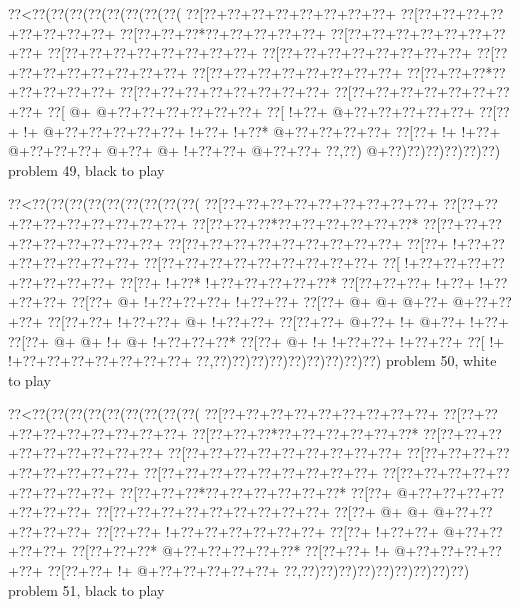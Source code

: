 \vbox{\vbox{\goo
\0??<\0??(\0??(\0??(\0??(\0??(\0??(\0??(\0??(
\0??[\0??+\0??+\0??+\0??+\0??+\0??+\0??+\0??+
\0??[\0??+\0??+\0??+\0??+\0??+\0??+\0??+\0??+
\0??[\0??+\0??+\0??*\0??+\0??+\0??+\0??+\0??+
\0??[\0??+\0??+\0??+\0??+\0??+\0??+\0??+\0??+
\0??[\0??+\0??+\0??+\0??+\0??+\0??+\0??+\0??+
\0??[\0??+\0??+\0??+\0??+\0??+\0??+\0??+\0??+
\0??[\0??+\0??+\0??+\0??+\0??+\0??+\0??+\0??+
\0??[\0??+\0??+\0??+\0??+\0??+\0??+\0??+\0??+
\0??[\0??+\0??+\0??*\0??+\0??+\0??+\0??+\0??+
\0??[\0??+\0??+\0??+\0??+\0??+\0??+\0??+\0??+
\0??[\0??+\0??+\0??+\0??+\0??+\0??+\0??+\0??+
\0??[\- @+\- @+\0??+\0??+\0??+\0??+\0??+\0??+
\0??[\- !+\0??+\- @+\0??+\0??+\0??+\0??+\0??+
\0??[\0??+\- !+\- @+\0??+\0??+\0??+\0??+\0??+
\- !+\0??+\- !+\0??*\- @+\0??+\0??+\0??+\0??+
\0??[\0??+\- !+\- !+\0??+\- @+\0??+\0??+\0??+
\- @+\0??+\- @+\- !+\0??+\0??+\- @+\0??+\0??+
\0??,\0??)\- @+\0??)\0??)\0??)\0??)\0??)\0??)
}
\hfil problem 49, black to play\hfil\break
}

\vbox{\vbox{\goo
\0??<\0??(\0??(\0??(\0??(\0??(\0??(\0??(\0??(\0??(
\0??[\0??+\0??+\0??+\0??+\0??+\0??+\0??+\0??+\0??+
\0??[\0??+\0??+\0??+\0??+\0??+\0??+\0??+\0??+\0??+
\0??[\0??+\0??+\0??*\0??+\0??+\0??+\0??+\0??+\0??*
\0??[\0??+\0??+\0??+\0??+\0??+\0??+\0??+\0??+\0??+
\0??[\0??+\0??+\0??+\0??+\0??+\0??+\0??+\0??+\0??+
\0??[\0??+\- !+\0??+\0??+\0??+\0??+\0??+\0??+\0??+
\0??[\0??+\0??+\0??+\0??+\0??+\0??+\0??+\0??+\0??+
\0??[\- !+\0??+\0??+\0??+\0??+\0??+\0??+\0??+\0??+
\0??[\0??+\- !+\0??*\- !+\0??+\0??+\0??+\0??+\0??*
\0??[\0??+\0??+\0??+\- !+\0??+\- !+\0??+\0??+\0??+
\0??[\0??+\- @+\- !+\0??+\0??+\0??+\- !+\0??+\0??+
\0??[\0??+\- @+\- @+\- @+\0??+\- @+\0??+\0??+\0??+
\0??[\0??+\0??+\- !+\0??+\0??+\- @+\- !+\0??+\0??+
\0??[\0??+\0??+\- @+\0??+\- !+\- @+\0??+\- !+\0??+
\0??[\0??+\- @+\- @+\- !+\- @+\- !+\0??+\0??+\0??*
\0??[\0??+\- @+\- !+\- !+\0??+\0??+\- !+\0??+\0??+
\0??[\- !+\- !+\0??+\0??+\0??+\0??+\0??+\0??+\0??+
\0??,\0??)\0??)\0??)\0??)\0??)\0??)\0??)\0??)\0??)
}
\hfil problem 50, white to play\hfil\break
}

\vbox{\vbox{\goo
\0??<\0??(\0??(\0??(\0??(\0??(\0??(\0??(\0??(\0??(
\0??[\0??+\0??+\0??+\0??+\0??+\0??+\0??+\0??+\0??+
\0??[\0??+\0??+\0??+\0??+\0??+\0??+\0??+\0??+\0??+
\0??[\0??+\0??+\0??*\0??+\0??+\0??+\0??+\0??+\0??*
\0??[\0??+\0??+\0??+\0??+\0??+\0??+\0??+\0??+\0??+
\0??[\0??+\0??+\0??+\0??+\0??+\0??+\0??+\0??+\0??+
\0??[\0??+\0??+\0??+\0??+\0??+\0??+\0??+\0??+\0??+
\0??[\0??+\0??+\0??+\0??+\0??+\0??+\0??+\0??+\0??+
\0??[\0??+\0??+\0??+\0??+\0??+\0??+\0??+\0??+\0??+
\0??[\0??+\0??+\0??*\0??+\0??+\0??+\0??+\0??+\0??*
\0??[\0??+\- @+\0??+\0??+\0??+\0??+\0??+\0??+\0??+
\0??[\0??+\0??+\0??+\0??+\0??+\0??+\0??+\0??+\0??+
\0??[\0??+\- @+\- @+\- @+\0??+\0??+\0??+\0??+\0??+
\0??[\0??+\0??+\- !+\0??+\0??+\0??+\0??+\0??+\0??+
\0??[\0??+\- !+\0??+\0??+\- @+\0??+\0??+\0??+\0??+
\0??[\0??+\0??+\0??*\- @+\0??+\0??+\0??+\0??+\0??*
\0??[\0??+\0??+\- !+\- @+\0??+\0??+\0??+\0??+\0??+
\0??[\0??+\0??+\- !+\- @+\0??+\0??+\0??+\0??+\0??+
\0??,\0??)\0??)\0??)\0??)\0??)\0??)\0??)\0??)\0??)
}
\hfil problem 51, black to play\hfil\break
}

